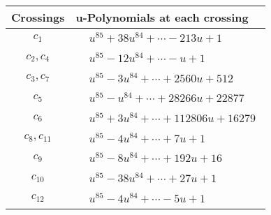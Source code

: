 \documentclass[1p]{elsarticle_modified}
\theoremstyle{definition}
\begin{document}
\begin{tabular}{m{50pt}|m{274pt}}
Crossings & \hspace{64pt}u-Polynomials at each crossing \\
\hline $$\begin{aligned}c_{1}\end{aligned}$$&$\begin{aligned}
&u^{85}+38 u^{84}+\cdots-213 u+1
\end{aligned}$\\
\hline $$\begin{aligned}c_{2},c_{4}\end{aligned}$$&$\begin{aligned}
&u^{85}-12 u^{84}+\cdots- u+1
\end{aligned}$\\
\hline $$\begin{aligned}c_{3},c_{7}\end{aligned}$$&$\begin{aligned}
&u^{85}-3 u^{84}+\cdots+2560 u+512
\end{aligned}$\\
\hline $$\begin{aligned}c_{5}\end{aligned}$$&$\begin{aligned}
&u^{85}- u^{84}+\cdots+28266 u+22877
\end{aligned}$\\
\hline $$\begin{aligned}c_{6}\end{aligned}$$&$\begin{aligned}
&u^{85}+3 u^{84}+\cdots+112806 u+16279
\end{aligned}$\\
\hline $$\begin{aligned}c_{8},c_{11}\end{aligned}$$&$\begin{aligned}
&u^{85}-4 u^{84}+\cdots+7 u+1
\end{aligned}$\\
\hline $$\begin{aligned}c_{9}\end{aligned}$$&$\begin{aligned}
&u^{85}-8 u^{84}+\cdots+192 u+16
\end{aligned}$\\
\hline $$\begin{aligned}c_{10}\end{aligned}$$&$\begin{aligned}
&u^{85}-38 u^{84}+\cdots+27 u+1
\end{aligned}$\\
\hline $$\begin{aligned}c_{12}\end{aligned}$$&$\begin{aligned}
&u^{85}-4 u^{84}+\cdots-5 u+1
\end{aligned}$\\
\hline
\end{tabular}\\~\\
\end{document}
